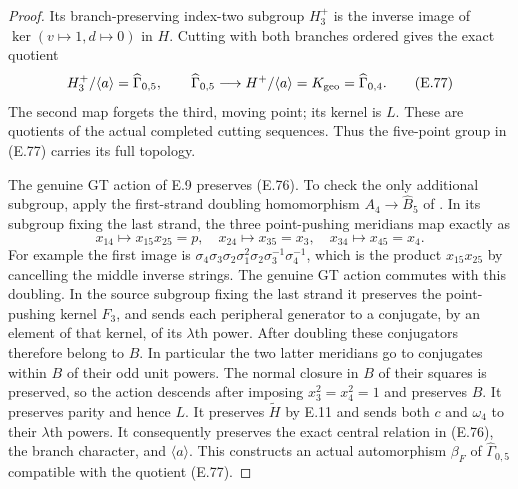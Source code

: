 \begin{proof}
Its branch-preserving index-two subgroup
$H_3^+$ is the inverse image of
$\ker(v\mapsto1,d\mapsto0)$ in $H$.
Cutting with both branches ordered gives
the exact quotient
\[
 H_3^+/\langle a\rangle=\widehat\Gamma_{0,5},
 \qquad
 \widehat\Gamma_{0,5}\longrightarrow
        H^+/\langle a\rangle
          =K_{\rm geo}=\widehat\Gamma_{0,4}.             \tag{E.77}
\]
The second map forgets the third, moving
point; its kernel is $L$.
These are quotients of the actual completed
cutting sequences.  Thus the five-point
group in (E.77) carries its full topology.

The genuine GT action of E.9 preserves
(E.76).  To check the only additional
subgroup, apply the first-strand doubling
homomorphism
$A_4\to\widehat B_5$ of
\cite[\S0.3, pp.~7--8]{ET_HS2000}.
In its subgroup fixing the last strand,
the three point-pushing meridians map exactly as
\[
 x_{14}\longmapsto x_{15}x_{25}=p,
 \quad x_{24}\longmapsto x_{35}=x_3,
 \quad x_{34}\longmapsto x_{45}=x_4.
\]
For example the first image is
$\sigma_4\sigma_3\sigma_2\sigma_1^2
\sigma_2\sigma_3^{-1}\sigma_4^{-1}$,
which is the product $x_{15}x_{25}$ by
cancelling the middle inverse strings.
The genuine GT action commutes
with this doubling.  In the source subgroup
fixing the last strand it preserves the
point-pushing kernel $F_3$, and sends each
peripheral generator to a conjugate, by an
element of that kernel, of its $\lambda$th
power.  After doubling these conjugators
therefore belong to $B$.  In particular the
two latter meridians go to conjugates within
$B$ of their odd unit powers.  The normal
closure in $B$ of their squares is preserved,
so the action descends after imposing
$x_3^2=x_4^2=1$ and preserves $B$.
It preserves parity and hence $L$.
It preserves $\widetilde H$ by E.11 and sends
both $c$ and $\omega_4$ to their
$\lambda$th powers.  It consequently preserves
the exact central relation in (E.76), the
branch character, and $\langle a\rangle$.
This constructs an actual automorphism
$\beta_F$ of $\widehat\Gamma_{0,5}$ compatible
with the quotient (E.77).


\end{proof}
